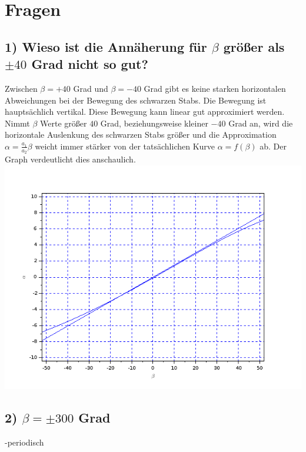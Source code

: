 \section{Fragen}
\subsection*{1) Wieso ist die Annäherung für $\beta$ größer als $\pm40$ Grad nicht so gut?}
Zwischen $\beta=+40$ Grad und $\beta=-40$ Grad gibt es keine starken horizontalen Abweichungen bei der Bewegung des schwarzen Stabs. Die Bewegung ist hauptsächlich vertikal. Diese Bewegung kann linear gut approximiert werden. Nimmt $\beta$ Werte größer $40$ Grad, beziehungsweise kleiner $-40$ Grad an, wird die horizontale Auslenkung des schwarzen Stabs größer und die Approximation $\alpha=\frac{a_1}{a_2}\beta$ weicht immer stärker von der tatsächlichen Kurve $\alpha = f(\beta)$ ab. Der Graph verdeutlicht dies anschaulich.\\
\includegraphics[scale=0.5]{images/plot1.png}

\subsection{2) $\beta = \pm 300$ Grad}
-periodisch